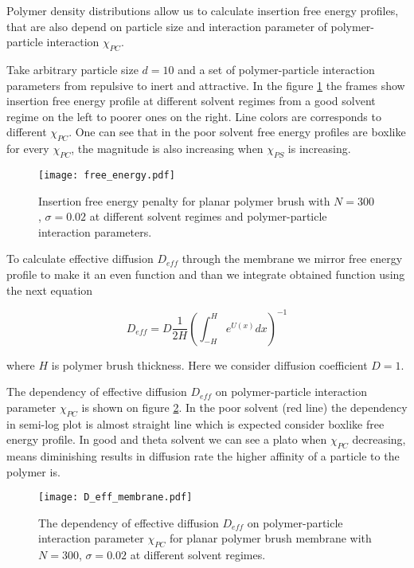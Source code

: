 \documentclass[12pt,a4paper]{article}
\begin{document}
Polymer density distributions allow us to calculate insertion free energy profiles, that are also depend on particle size and interaction parameter of polymer-particle interaction $\chi_{PC}$. 

Take arbitrary particle size $d=10$ and a set of polymer-particle interaction parameters from repulsive to inert and attractive. In the figure \ref{fig:fe_planar} the frames show insertion free energy profile at different solvent regimes from a good solvent regime on the left to poorer ones on the right. Line colors are corresponds to different $\chi_{PC}$. 
One can see that in the poor solvent free energy profiles are boxlike for every $\chi_{PC}$, the magnitude is also increasing when $\chi_{PS}$ is increasing.

\begin{figure}
    \center
    \texttt{[image: free\_energy.pdf]}
    \caption{Insertion free energy penalty for planar polymer brush with $N=300$, $\sigma = 0.02$ at different solvent regimes and polymer-particle interaction parameters.}
    \label{fig:fe_planar}
\end{figure}

To calculate effective diffusion $D_{eff}$ through the membrane we mirror free energy profile to make it an even function and than we integrate obtained function using the next equation

\begin{equation}
    D_{eff} = D \frac{1}{2H}\left(\int_{-H}^{H}e^{U(x)}dx\right)^{-1}
    \label{D_eff}
\end{equation}

where $H$ is polymer brush thickness. Here we consider diffusion coefficient $D=1$.

The dependency of effective diffusion $D_{eff}$ on polymer-particle interaction parameter $\chi_{PC}$ is shown on figure \ref{fig:D_eff_planar}. 
In the poor solvent (red line) the dependency in semi-log plot is almost straight line which is expected consider boxlike free energy profile. In good and theta solvent we can see a plato when $\chi_{PC}$ decreasing, means diminishing results in diffusion rate the higher affinity of a particle to the polymer is. 

\begin{figure}
    \center
    \texttt{[image: D\_eff\_membrane.pdf]}
    \caption{The dependency of effective diffusion $D_{eff}$ on polymer-particle interaction parameter $\chi_{PC}$ for planar polymer brush membrane with $N=300$, $\sigma = 0.02$ at different solvent regimes.}
    \label{fig:D_eff_planar}
\end{figure}
\end{document}

